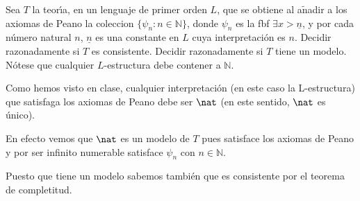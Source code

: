 \begin{problem} Sea $T$ la teor\'{\i}a, 
 en un lenguaje de primer orden  $L$, que se obtiene al a$\operatorname{\tilde{n}}$adir a los
axiomas de Peano la coleccion $\{ \psi_n: n\in\mathbb{N}\}$, donde
$\psi_n$ es la fbf $\exists x > \underline{n}$,  y  por cada n\'umero natural $n$,  $ \underline{n}$ es una constante
en $L$ cuya interpretaci\'on es $n$.
 Decidir razonadamente si 
$T$ es consistente. Decidir razonadamente si $T$ tiene un modelo. 
\obs N\'otese que  cualquier
$L$-estructura debe contener a $\mathbb{N}$.
\solution


Como hemos visto en clase, cualquier interpretación (en este caso la L-estructura) que satisfaga los axiomas de Peano debe ser $\nat$ (en este sentido, $\nat$ es único).
 
En efecto vemos que $\nat$ es un modelo de $T$ pues satisface los axiomas de Peano y por ser infinito numerable satisface $\psi_n$ con $n\in\mathbb{N}$.

Puesto que tiene un modelo sabemos también que es consistente por el teorema de completitud.

\end{problem}